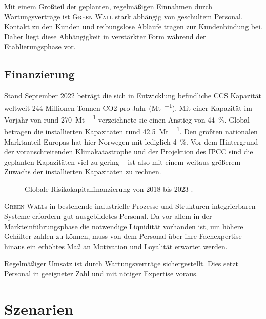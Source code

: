 Mit einem Großteil der geplanten, regelmäßigen Einnahmen durch Wartungsverträge ist \textsc{Green Wall} stark abhängig von geschultem Personal.
Kontakt zu den Kunden und reibungslose Abläufe tragen zur Kundenbindung bei.
Daher liegt diese Abhängigkeit in verstärkter Form während der Etablierungsphase vor.\par


\subsection{Finanzierung}

Stand September 2022 beträgt die sich in Entwicklung befindliche CCS Kapazität weltweit \num{244} Millionen Tonnen CO2 pro Jahr (\unit{\mega\tonne\per\an}).
Mit einer Kapazität im Vorjahr von rund \qty{270}{\mega\tonne\per\an} verzeichnete sie einen Anstieg von \qty{44}{\percent}.
Global betragen die installierten Kapazitäten rund \qty{42.5}{\mega\tonne\per\an}.
Den größten nationalen Marktanteil Europas hat hier Norwegen mit lediglich \qty{4}{\percent}.
Vor dem Hintergrund der voranschreitenden Klimakatastrophe und der Projektion des IPCC sind die geplanten Kapazitäten viel zu gering -- ist also mit einem weitaus größerem Zuwachs der installierten Kapazitäten zu rechnen\cite{Book.EJR.CARBONCAPTUREUTILISATIONANDSTORAGEINTHEEUROPEANUNION.2023}.\par\medskip
%
\begin{figure}[h]
    \centering
    
    \caption[Globale Risikokapitalfinanzierung von 2018 bis 2023]{Globale Risikokapitalfinanzierung von 2018 bis 2023 \cite{Statista2022.GlobalVentureCapital}.}\label{fig:glob ccus vc inv}
\end{figure}

\textsc{Green Wall}s in bestehende industrielle Prozesse und Strukturen integrierbaren Systeme erfordern gut ausgebildetes Personal.
Da vor allem in der Markteinführungsphase die notwendige Liquidität vorhanden ist, um höhere Gehälter zahlen zu können, muss von dem Personal über ihre Fachexpertise hinaus ein erhöhtes Maß an Motivation und Loyalität erwartet werden.\par\medskip

Regelmäßiger Umsatz ist durch Wartungsverträge sichergestellt.
Dies setzt Personal in geeigneter Zahl und mit nötiger Expertise voraus.

\section{Szenarien}


